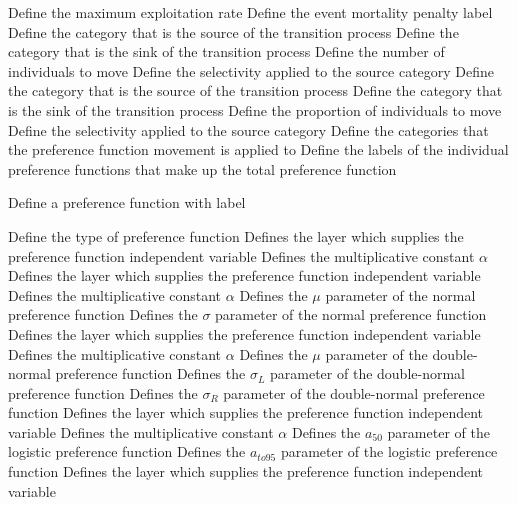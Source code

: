  {Define the maximum exploitation rate}
 {Define the event mortality penalty label}
 {Define the category that is the source of the transition process}
 {Define the category that is the sink of the transition process}
 {Define the number of individuals to move}
 {Define the selectivity applied to the source category}
 {Define the category that is the source of the transition process}
 {Define the category that is the sink of the transition process}
 {Define the proportion of individuals to move}
 {Define the selectivity applied to the source category}
 {Define the categories that the preference function movement is applied to}
 {Define the labels of the individual  preference functions that make up the total preference function}
\par {} {Define a preference function with label}\par \par
{} {Define the type of preference function}
 {Defines the layer which supplies the preference function independent variable}
 {Defines the multiplicative constant $\alpha$}
 {Defines the layer which supplies the preference function independent variable}
 {Defines the multiplicative constant $\alpha$}
 {Defines the $\mu$ parameter of the normal preference function}
 {Defines the $\sigma$ parameter of the normal preference function}
 {Defines the layer which supplies the preference function independent variable}
 {Defines the multiplicative constant $\alpha$}
 {Defines the $\mu$ parameter of the double-normal preference function}
 {Defines the $\sigma_L$ parameter of the double-normal preference function}
 {Defines the $\sigma_R$ parameter of the double-normal preference function}
 {Defines the layer which supplies the preference function independent variable}
 {Defines the multiplicative constant $\alpha$}
 {Defines the $a_{50}$ parameter of the logistic preference function}
 {Defines the $a_{to95}$ parameter of the logistic preference function}
 {Defines the layer which supplies the preference function independent variable}
